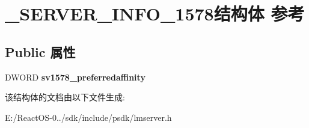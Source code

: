 \hypertarget{struct___s_e_r_v_e_r___i_n_f_o__1578}{}\section{\+\_\+\+S\+E\+R\+V\+E\+R\+\_\+\+I\+N\+F\+O\+\_\+1578结构体 参考}
\label{struct___s_e_r_v_e_r___i_n_f_o__1578}
\subsection*{Public 属性}
\begin{DoxyCompactItemize}
\item 
\mbox{\label{struct___s_e_r_v_e_r___i_n_f_o__1578_ac764ad6670b79c803a180fe9ecefa447}} 
D\+W\+O\+RD {\bfseries sv1578\+\_\+preferredaffinity}
\end{DoxyCompactItemize}


该结构体的文档由以下文件生成\+:\begin{DoxyCompactItemize}
\item 
E\+:/\+React\+O\+S-\/0../sdk/include/psdk/lmserver.\+h\end{DoxyCompactItemize}
